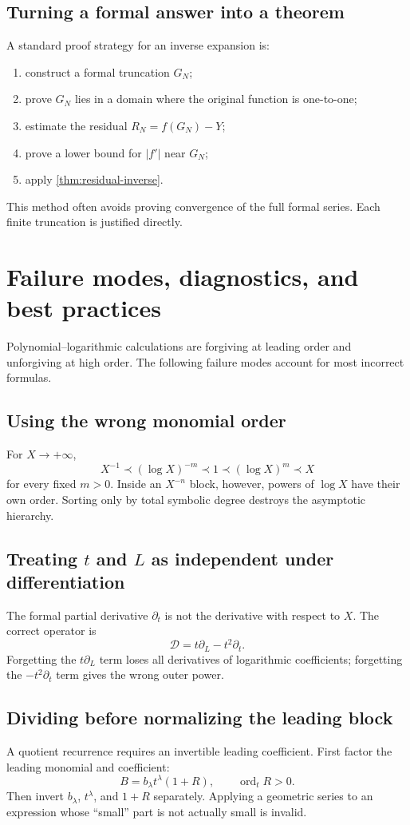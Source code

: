 \documentclass[11pt,oneside]{book}
\theoremstyle{definition}
\theoremstyle{remark}
\DeclareMathOperator{\ord}{ord}
\newcommand{\D}{\mathcal D}
\newcommand{\precdom}{\prec}
\begin{document}
\section{Turning a formal answer into a theorem}
A standard proof strategy for an inverse expansion is:
\begin{enumerate}
\item construct a formal truncation $G_N$;
\item prove $G_N$ lies in a domain where the original function is
      one-to-one;
\item estimate the residual $R_N=f(G_N)-Y$;
\item prove a lower bound for $|f'|$ near $G_N$;
\item apply \cref{thm:residual-inverse}.
\end{enumerate}
This method often avoids proving convergence of the full formal series.
Each finite truncation is justified directly.

\chapter{Failure modes, diagnostics, and best practices}
\label{ch:pitfalls}

Polynomial--logarithmic calculations are forgiving at leading order and
unforgiving at high order. The following failure modes account for most
incorrect formulas.

\section{Using the wrong monomial order}
For $X\to+\infty$,
\[
 X^{-1}\precdom(\log X)^{-m}\precdom1\precdom(\log X)^m\precdom X
\]
for every fixed $m>0$. Inside an $X^{-n}$ block, however, powers of
$\log X$ have their own order. Sorting only by total symbolic degree
destroys the asymptotic hierarchy.

\section{Treating \texorpdfstring{$t$}{t} and \texorpdfstring{$L$}{L} as independent under differentiation}
The formal partial derivative $\partial_t$ is not the derivative with
respect to $X$. The correct operator is
\[
 \D=t\partial_L-t^2\partial_t.
\]
Forgetting the $t\partial_L$ term loses all derivatives of logarithmic
coefficients; forgetting the $-t^2\partial_t$ term gives the wrong outer
power.

\section{Dividing before normalizing the leading block}
A quotient recurrence requires an invertible leading coefficient. First
factor the leading monomial and coefficient:
\[
 B=b_\lambda t^\lambda(1+R),\qquad \ord_tR>0.
\]
Then invert $b_\lambda$, $t^\lambda$, and $1+R$ separately. Applying a
geometric series to an expression whose ``small'' part is not actually
small is invalid.
\end{document}
